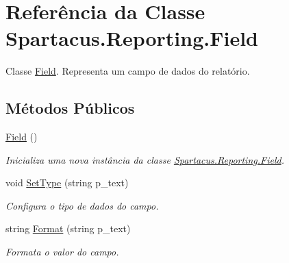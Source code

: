 \hypertarget{classSpartacus_1_1Reporting_1_1Field}{\section{Referência da Classe Spartacus.\+Reporting.\+Field}
\label{classSpartacus_1_1Reporting_1_1Field}
}


Classe \hyperlink{classSpartacus_1_1Reporting_1_1Field}{Field}. Representa um campo de dados do relatório.  


\subsection*{Métodos Públicos}
\begin{DoxyCompactItemize}
\item 
\hyperlink{classSpartacus_1_1Reporting_1_1Field_a1e6829898ecae8e47e6efd338115a2ab}{Field} ()
\begin{DoxyCompactList}\small\item\em Inicializa uma nova instância da classe \hyperlink{classSpartacus_1_1Reporting_1_1Field}{Spartacus.\+Reporting.\+Field}. \end{DoxyCompactList}\item 
void \hyperlink{classSpartacus_1_1Reporting_1_1Field_a7598fc4784f4155295878f476a97915b}{Set\+Type} (string p\+\_\+text)
\begin{DoxyCompactList}\small\item\em Configura o tipo de dados do campo. \end{DoxyCompactList}\item 
string \hyperlink{classSpartacus_1_1Reporting_1_1Field_affd2cc489185f7d286cdc34c1ba57fd9}{Format} (string p\+\_\+text)
\begin{DoxyCompactList}\small\item\em Formata o valor do campo. \end{DoxyCompactList}\end{DoxyCompactItemize}
